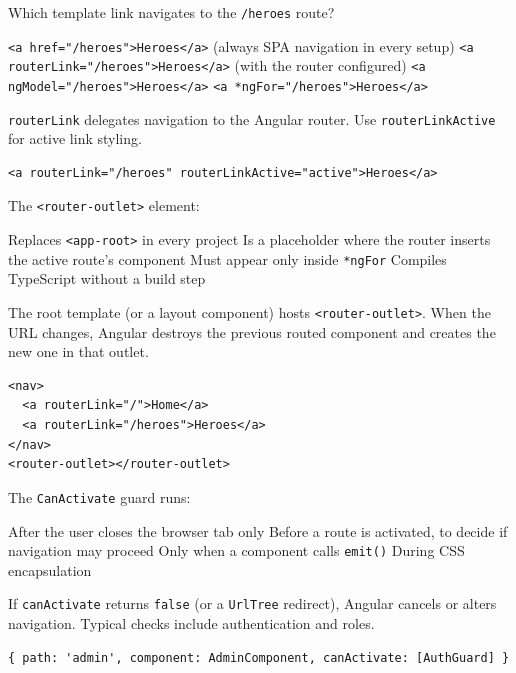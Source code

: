 \question[4]
Which template link navigates to the \texttt{/heroes} route?
\begin{choices}
  \choice \lstinline[style=htmlinline]|<a href="/heroes">Heroes</a>| (always SPA navigation in every setup)
  \CorrectChoice \lstinline[style=htmlinline]|<a routerLink="/heroes">Heroes</a>| (with the router configured)
  \choice \lstinline[style=htmlinline]|<a ngModel="/heroes">Heroes</a>|
  \choice \lstinline[style=htmlinline]|<a *ngFor="/heroes">Heroes</a>|
\end{choices}
\begin{solution}
  \lstinline[style=htmlinline]|routerLink| delegates navigation to the Angular router. Use \lstinline[style=htmlinline]|routerLinkActive| for active link styling.
\begin{lstlisting}[style=htmlinline]
<a routerLink="/heroes" routerLinkActive="active">Heroes</a>
\end{lstlisting}
\end{solution}



\newpage




\question[4]
The \lstinline[style=htmlinline]|<router-outlet>| element:
\begin{choices}
  \choice Replaces \lstinline[style=htmlinline]|<app-root>| in every project
  \CorrectChoice Is a placeholder where the router inserts the active route's component
  \choice Must appear only inside \lstinline[style=htmlinline]|*ngFor|
  \choice Compiles TypeScript without a build step
\end{choices}
\begin{solution}
  The root template (or a layout component) hosts \lstinline[style=htmlinline]|<router-outlet>|. When the URL changes, Angular destroys the previous routed component and creates the new one in that outlet.
\begin{lstlisting}[style=htmlinline]
<nav>
  <a routerLink="/">Home</a>
  <a routerLink="/heroes">Heroes</a>
</nav>
<router-outlet></router-outlet>
\end{lstlisting}
\end{solution}

\question[4]
The \lstinline[style=tsinline]|CanActivate| guard runs:
\begin{choices}
  \choice After the user closes the browser tab only
  \CorrectChoice Before a route is activated, to decide if navigation may proceed
  \choice Only when a component calls \lstinline[style=tsinline]|emit()|
  \choice During CSS encapsulation
\end{choices}
\begin{solution}
  If \lstinline[style=tsinline]|canActivate| returns \lstinline[style=tsinline]|false| (or a \lstinline[style=tsinline]|UrlTree| redirect), Angular cancels or alters navigation. Typical checks include authentication and roles.
\begin{lstlisting}[style=ts]
{ path: 'admin', component: AdminComponent, canActivate: [AuthGuard] }
\end{lstlisting}
\end{solution}

